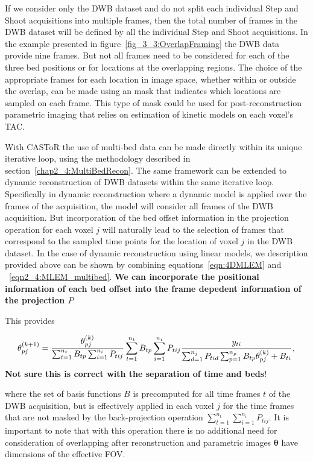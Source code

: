 If we consider only the DWB dataset and do not split each individual Step and Shoot acquisitions into multiple frames, then the total number of frames in the DWB dataset will be defined by all the individual Step and Shoot acquisitions. In the example presented in figure~\ref{fig_3_3:OverlapFraming} the DWB data provide nine frames. 
But not all frames need to be considered for each of the three bed positions or for locations at the overlapping regions. 
The choice of the appropriate frames for each location in image space, whether within or outside the overlap, can be made using an mask that indicates which locations are sampled on each frame. 
This type of mask could be used for post-reconstruction parametric imaging that relies on estimation of kinetic models on each voxel's TAC. 

With CASToR the use of multi-bed data can be made directly within its unique iterative loop, using the methodology described in section~\ref{chap2_4:MultiBedRecon}. The same framework can be extended to dynamic reconstruction of DWB datasets within the same iterative loop. Specifically in dynamic reconstruction where a dynamic model is applied over the frames of the acquisition, the model will consider all frames of the DWB acquisition. But incorporation of the bed offset information in the projection operation for each voxel $j$ will naturally lead to the selection of frames that correspond to the sampled time points for the location of voxel $j$ in the DWB dataset.
In the case of dynamic reconstruction using linear models, we description provided above can be shown by combining equations~\ref{eqn:4DMLEM} and ~\ref{eqn2_4:MLEM_multibed}. \textbf{We can incorporate the positional information of each bed offset into the frame depedent information of the projection $P$}

This provides

\begin{equation}
\theta_{pj}^{(k+1)} = \frac{\theta_{pj}^{(k)}}
{\sum_{t=1}^{n_t} B_{tp} \sum_{i=1}^{n_i} P_{tij}} 
\sum_{t=1}^{n_t} B_{tp}  \sum_{i=1}^{n_i} P_{tij} 
\frac{y_{ti}}
{\sum_{d=1}^{n_j} P_{tid} \sum_{p=1}^{n_p} B_{tp}\theta_{pj}^{(k)} + B_{ti} } \\, \\
\label{eqn:4DMLEM_Multibed}
\end{equation} 
\textbf{Not sure this is correct with the separation of time and beds}!

where the set of basis functions $B$ is precomputed for all time frames $t$ of the DWB acquisition, but is effectively applied in each voxel $j$ for the time frames that are not masked by the back-projection operation $\sum_{t=1}^{n_t} \sum_{i=1}^{n_i} P_{tij}$. It is important to note that with this operation there is no additional need for consideration of overlapping after reconstruction and parametric images $\boldsymbol\theta$ have dimensions of the effective FOV. 


